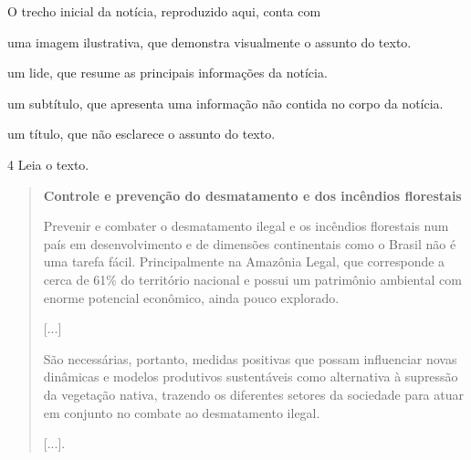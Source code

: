 O trecho inicial da notícia, reproduzido aqui, conta com

\begin{escolha}
\item uma imagem ilustrativa, que demonstra visualmente o assunto do texto.

\item um lide, que resume as principais informações da notícia.

\item um subtítulo, que apresenta uma informação não contida no corpo da notícia.

\item um título, que não esclarece o assunto do texto.
\end{escolha}


\num{4} Leia o texto.

\begin{quote}
\textbf{Controle e prevenção do desmatamento e dos incêndios florestais}

Prevenir e combater o desmatamento ilegal e os incêndios florestais num
país em desenvolvimento e de dimensões continentais como o Brasil não é
uma tarefa fácil. Principalmente na Amazônia Legal, que corresponde a
cerca de 61\% do território nacional e possui um patrimônio ambiental
com enorme potencial econômico, ainda pouco explorado.

{[}...{]}

São necessárias, portanto, medidas positivas que possam influenciar
novas dinâmicas e modelos produtivos sustentáveis como alternativa à
supressão da vegetação nativa, trazendo os diferentes setores da
sociedade para atuar em conjunto no combate ao desmatamento ilegal.

{[}...{]}.

\end{quote}

